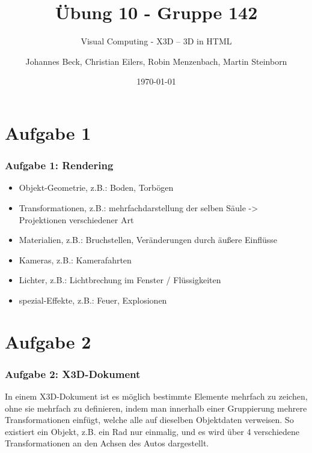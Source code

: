 \documentclass[accentcolor=tud9c,colorbacktitle,inverttitle,landscape,german,presentation,t]{tudbeamer}
\begin{document}
\title{\"Ubung 10 - Gruppe 142} 
\subtitle{Visual Computing - X3D – 3D in HTML} 

\author[Johannes Beck, Christian Eilers, Robin Menzenbach, Martin Steinborn]{Johannes Beck, Christian Eilers, Robin Menzenbach, Martin Steinborn}


\date{\today}

\begin{titleframe}
\end{titleframe}

\section{Aufgabe 1}
	\begin{frame}
		\frametitle{Aufgabe 1: Rendering}
		\begin{itemize}
			\item Objekt-Geometrie, z.B.: Boden, Torbögen
			\item Transformationen, z.B.: mehrfachdarstellung der selben Säule -> Projektionen verschiedener Art
			\item Materialien, z.B.: Bruchstellen, Veränderungen durch äußere Einflüsse
			\item Kameras, z.B.: Kamerafahrten
			\item Lichter, z.B.: Lichtbrechung im Fenster / Flüssigkeiten
			\item spezial-Effekte, z.B.: Feuer, Explosionen
		\end{itemize}
	\end{frame}

\section{Aufgabe 2}
\begin{frame}
	\frametitle{Aufgabe 2: X3D-Dokument}
	In einem X3D-Dokument ist es möglich bestimmte Elemente mehrfach zu zeichen, ohne sie mehrfach zu definieren, indem man innerhalb einer Gruppierung mehrere Transformationen einfügt, welche alle auf dieselben Objektdaten verweisen. So existiert ein Objekt, z.B. ein Rad nur einmalig, und es wird über 4 verschiedene Transformationen an den Achsen des Autos dargestellt.
\end{frame}
\end{document}
